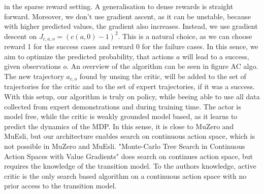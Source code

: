 in the sparse reward setting. A generalisation to dense rewards is straight forward. Moreover, we don't use gradient ascent, as it can be unstable, because with 
higher predicted values, the gradient also increases. Instead, we use gradient descent on $J_{c, a, o} = (c(a, 0) - 1)^2$. This is a natural choice, as we can 
choose reward 1 for the success cases and reward 0 for the failure cases. In this sence, we aim to optimize the predicted probability, that actions $a$ will lead 
to a success, given observations $o$. An overview of the algorithm can be seen in figure {AC algo}. The new trajectory $a_{c, o}$ found by unsing the critic, will 
be added to the set of trajectories for the critic and to the set of expert trajectories, if it was a success. \\
With this setup, our algorithm is truly on policy, while beeing able to use all data collected from expert demonstrations and during training time. The actor is 
model free, while the critic is weakly grounded model based, as it learns to predict the dynamics of the MDP. In this sense, it is close to MuZero and MuEsli, 
but our architecture enables search on continuous action space, which is not possible in MuZero and MuEsli. 
"Monte-Carlo Tree Search in Continuous Action Spaces with Value Gradients" does search on continues action space, but requires the knowledge of the transition model. 
To the authors knowledge, active critic is the only search based algorithm on a continuous action space with no prior access to the transition model.


